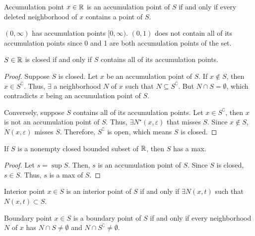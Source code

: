 \begin{definition}{Accumulation point}{}
    $x \in \mathbb{R}$ is an accumulation point of $S$ if and only if every deleted neighborhood of $x$ contains a point of $S$.
\end{definition}
\begin{note}
    $(0, \infty)$ has accumulation points $[0, \infty)$. $(0, 1)$ does not contain all of its accumulation points since 0 and 1 are both accumulation points of the set.
\end{note}

\begin{theorem}{}{}
    $S \in \mathbb{R}$ is closed if and only if $S$ contains all of its accumulation points.
\end{theorem}
\begin{proof}
    Suppose $S$ is closed. Let $x$ be an accumulation point of $S$. If $x \not\in S$, then $x \in S^\complement$. Thus, $\exists$ a neighborhood $N$ of $x$ such that $N \subseteq S^\complement$. But $N \cap S = \emptyset$, which contradicts $x$ being an accumulation point of $S$.

    Conversely, suppose $S$ contains all of its accumulation points. Let $x \in S^\complement$, then $x$ is not an accumulation point of $S$. Thus, $\exists N^\star(x, \varepsilon)$ that misses $S$. Since $x \not\in S$, $N(x, \varepsilon)$ misses $S$. Therefore, $S^\complement$ is open, which means $S$ is closed.
\end{proof}

\begin{theorem}{}{}
    If $S$ is a nonempty closed bounded subset of $\mathbb{R}$, then $S$ has a max.
\end{theorem}
\begin{proof}
    Let $s = \sup S$. Then, $s$ is an accumulation point of $S$. Since $S$ is closed, $s \in S$. Thus, $s$ is a max of $S$.
\end{proof}

\begin{definition}{Interior point}{}
    $x \in S$ is an interior point of $S$ if and only if $\exists N(x, t)$ such that $N(x, t) \subset S$.
\end{definition}

\begin{definition}{Boundary point}{}
    $x \in S$ is a boundary point of $S$ if and only if every neighborhood $N$ of $x$ has $N \cap S \neq \emptyset$ and $N \cap S^\complement \neq \emptyset$.
\end{definition}

